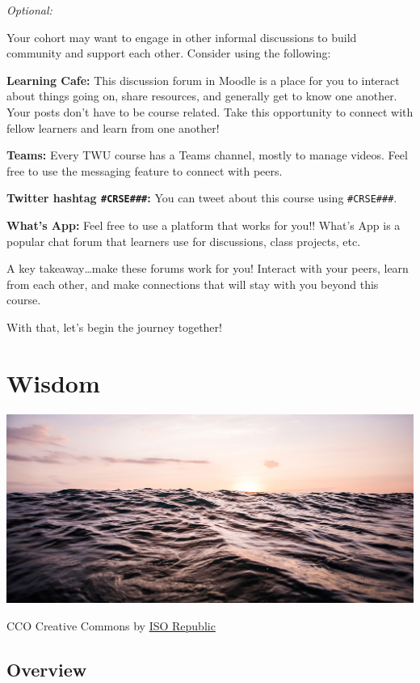 \documentclass[
]{book}
\begin{document}
\emph{Optional:}

Your cohort may want to engage in other informal discussions to build community and support each other. Consider using the following:

\textbf{Learning Cafe:} This discussion forum in Moodle is a place for you to interact about things going on, share resources, and generally get to know one another. Your posts don't have to be course related. Take this opportunity to connect with fellow learners and learn from one another!

\textbf{Teams:} Every TWU course has a Teams channel, mostly to manage videos. Feel free to use the messaging feature to connect with peers.

\textbf{Twitter hashtag \texttt{\#CRSE\#\#\#}:} You can tweet about this course using \texttt{\#CRSE\#\#\#}.

\textbf{What's App:} Feel free to use a platform that works for you!! What's App is a popular chat forum that learners use for discussions, class projects, etc.

A key takeaway\ldots make these forums work for you! Interact with your peers, learn from each other, and make connections that will stay with you beyond this course.

With that, let's begin the journey together!

\hypertarget{wisdom}{%
\chapter{Wisdom}\label{wisdom}}

\includegraphics{assets/u1/Unit_1_Overview.png}

CCO Creative Commons by \href{https://isorepublic.com/photo/sun-reflecting-on-waves/}{ISO Republic}

\hypertarget{overview}{%
\section{Overview}\label{overview}}
\end{document}
